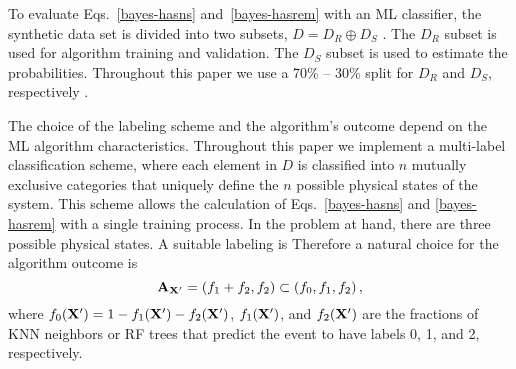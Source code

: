 To evaluate Eqs.~\eqref{bayes-hasns} and~\eqref{bayes-hasrem} with an \ac{ML} classifier, the synthetic data set is divided into two subsets, $D=D_R\oplus D_S$ . The $D_R$ subset is used
for algorithm training and validation. The $D_S$ subset is used to estimate the probabilities. Throughout this paper we use a 70\% -- 30\% split for $D_R$
and $D_S$, respectively .

The choice of the labeling scheme and the algorithm's outcome depend on the \ac{ML} algorithm characteristics. Throughout this paper we implement a multi-label classification scheme,
where each element in $D$ is classified into $n$ mutually exclusive categories that uniquely define the $n$ possible physical states of the system.  This scheme allows the calculation of Eqs.~\eqref{bayes-hasns} and \eqref{bayes-hasrem} with a single
training process. In the problem at hand, there are three possible physical states. A suitable labeling is
%
%
 Therefore a natural choice for the algorithm outcome is
%
\begin{equation}
{\bf A}_{\bf X'}=(f_1+f_2,f_2)\subset (f_0,f_1,f_2)\,,
\end{equation}
%
where $f_0({\bf X}')=1-f_1({\bf X}')-f_2({\bf X}')$, $f_1({\bf X}')$, and $f_2({\bf X}')$ are the fractions of \ac{KNN} neighbors or \ac{RF} trees that predict the event to
have labels 0, 1, and 2, respectively.

